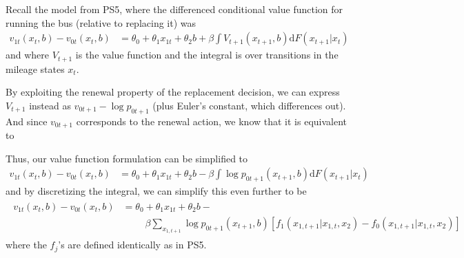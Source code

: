 \documentclass[12pt,english]{article}
\begin{document}
Recall the model from PS5, where the differenced conditional value function for running the bus (relative to replacing it) was
\begin{align}\label{eq:condv}
    v_{1t}\left(x_{t},b\right)-v_{0t}\left(x_{t},b\right) &= \theta_0 + \theta_1 x_{1t} + \theta_2 b + \beta \int V_{t+1}\left(x_{t+1},b\right) \mathrm{d}F\left(x_{t+1}\vert x_{t}\right)
\end{align}
and where $V_{t+1}$ is the value function and the integral is over transitions in the mileage states $x_{t}$.

By exploiting the renewal property of the replacement decision, we can express $V_{t+1}$ instead as $v_{0t+1} - \log p_{0t+1}$ (plus Euler's constant, which differences out). And since $v_{0t+1}$ corresponds to the renewal action, we know that it is equivalent to 

Thus, our value function formulation can be simplified to
\begin{align}\label{eq:condvccp}
    v_{1t}\left(x_{t},b\right)-v_{0t}\left(x_{t},b\right) &= \theta_0 + \theta_1 x_{1t} + \theta_2 b - \beta \int \log p_{0t+1}\left(x_{t+1},b\right) \mathrm{d}F\left(x_{t+1}\vert x_{t}\right)
\end{align}
and by discretizing the integral, we can simplify this even further to be 
\begin{align}\label{eq:condv2}
\begin{split}
    v_{1t}\left(x_{t},b\right)-v_{0t}\left(x_{t},b\right) &= \theta_0 + \theta_1 x_{1t} + \theta_2 b - \\
    &\phantom{\text{===}}\beta \sum_{x_{1,t+1}} \log p_{0t+1}\left(x_{t+1},b\right)\left[f_{1}\left(x_{1,t+1}\vert x_{1,t},x_{2}\right) - f_{0}\left(x_{1,t+1}\vert x_{1,t},x_{2}\right)\right]
    \end{split}
\end{align}
where the $f_j$'s are defined identically as in PS5.
\end{document}
